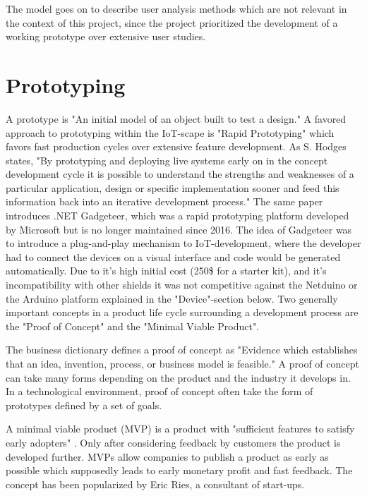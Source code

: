 The model goes on to describe user analysis methods which are not relevant in the context of this project, 
since the project prioritized the development of a working prototype over extensive user studies. 

\section{Prototyping}
A prototype is "An initial model of an object built to test a design." \parencite{prototypeDef}
A favored approach to prototyping within the IoT-scape is "Rapid Prototyping" 
which favors fast production cycles over extensive feature development. 
As S. Hodges states, "By prototyping and deploying live systems early on in the concept development cycle it is possible to understand the strengths and weaknesses of a particular application, design or specific implementation sooner 
and feed this information back into an iterative development process." \parencite{rapidProto3}
The same paper introduces .NET Gadgeteer, which was a rapid prototyping platform developed by Microsoft but is no longer maintained since 2016.
The idea of Gadgeteer was to introduce a plug-and-play mechanism to IoT-development, where the developer had to connect the devices on a visual interface and code would be generated automatically.
Due to it's high initial cost (250\$ for a starter kit), 
and it's incompatibility with other shields it was not competitive against the Netduino or the Arduino platform explained in the "Device"-section below.
Two generally important concepts in a product life cycle surrounding a development process 
are the "Proof of Concept" and the "Minimal Viable Product".

The business dictionary defines a proof of concept as "Evidence which establishes that an idea, invention, process, or business model is feasible."
\parencite{PoC}
A proof of concept can take many forms depending on the product and the industry it develops in. 
In a technological environment, proof of concept often take the form of prototypes defined by a set of goals.

A minimal viable product (MVP) is a product with "sufficient features to satisfy early adopters" \parencite{mvp}. 
Only after considering feedback by customers the product is developed further. 
MVPs allow companies to publish a product as early as possible which supposedly leads to early monetary profit and fast feedback. 
The concept has been popularized by Eric Ries, a consultant of start-ups.

